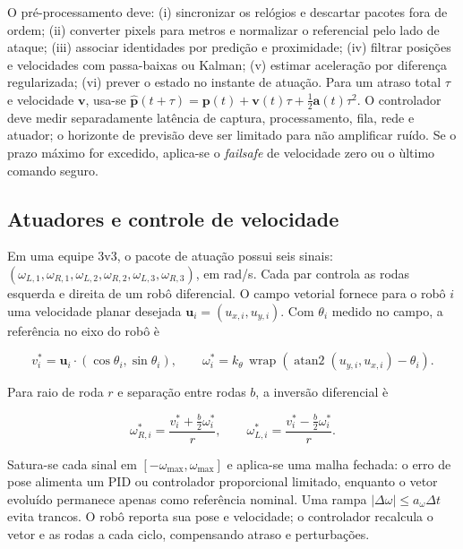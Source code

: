 \documentclass[12pt,a4paper]{article}
\newcommand{\vect}[1]{\boldsymbol{#1}}
\begin{document}
O pr\'e-processamento deve: (i) sincronizar os rel\'ogios e descartar pacotes fora de ordem; (ii) converter pixels para metros e normalizar o referencial pelo lado de ataque; (iii) associar identidades por predi\c{c}\~ao e proximidade; (iv) filtrar posi\c{c}\~oes e velocidades com passa-baixas ou Kalman; (v) estimar acelera\c{c}\~ao por diferen\c{c}a regularizada; (vi) prever o estado no instante de atua\c{c}\~ao. Para um atraso total $\tau$ e velocidade $\vect v$, usa-se $\widehat{\vect p}(t+\tau)=\vect p(t)+\vect v(t)\tau+\frac12\vect a(t)\tau^2$. O controlador deve medir separadamente lat\^encia de captura, processamento, fila, rede e atuador; o horizonte de previs\~ao deve ser limitado para n\~ao amplificar ru\'ido. Se o prazo m\'aximo for excedido, aplica-se o \emph{failsafe} de velocidade zero ou o \`ultimo comando seguro.

\subsection{Atuadores e controle de velocidade}

Em uma equipe 3v3, o pacote de atua\c{c}\~ao possui seis sinais: $(\omega_{L,1},\omega_{R,1},\omega_{L,2},\omega_{R,2},\omega_{L,3},\omega_{R,3})$, em rad/s. Cada par controla as rodas esquerda e direita de um rob\^o diferencial. O campo vetorial fornece para o rob\^o $i$ uma velocidade planar desejada $\vect u_i=(u_{x,i},u_{y,i})$. Com $\theta_i$ medido no campo, a refer\^encia no eixo do rob\^o \`e

\begin{equation}
 v_i^*=\vect u_i\cdot(\cos\theta_i,\sin\theta_i),\qquad
 \omega_i^*=k_\theta\,\operatorname{wrap}(\operatorname{atan2}(u_{y,i},u_{x,i})-\theta_i).
\end{equation}

Para raio de roda $r$ e separa\c{c}\~ao entre rodas $b$, a invers\~ao diferencial \`e

\begin{equation}
 \omega_{R,i}^*=\frac{v_i^*+\frac b2\omega_i^*}{r},\qquad
 \omega_{L,i}^*=\frac{v_i^*-\frac b2\omega_i^*}{r}.
\end{equation}

Satura-se cada sinal em $[-\omega_{\max},\omega_{\max}]$ e aplica-se uma malha fechada: o erro de pose alimenta um PID ou controlador proporcional limitado, enquanto o vetor evolu\'ido permanece apenas como refer\^encia nominal. Uma rampa $|\Delta\omega|\leq a_\omega\Delta t$ evita trancos. O rob\^o reporta sua pose e velocidade; o controlador recalcula o vetor e as rodas a cada ciclo, compensando atraso e perturba\c{c}\~oes.
\end{document}
